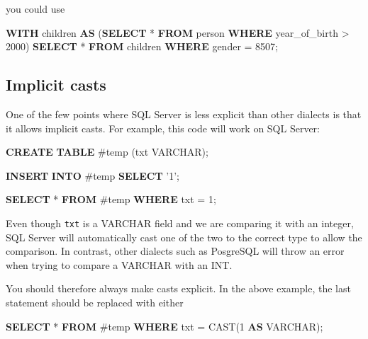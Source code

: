\documentclass[]{article}
\newenvironment{Shaded}{\begin{snugshade}}{\end{snugshade}}
\newcommand{\DataTypeTok}[1]{\textcolor[rgb]{0.13,0.29,0.53}{#1}}
\newcommand{\DecValTok}[1]{\textcolor[rgb]{0.00,0.00,0.81}{#1}}
\newcommand{\FunctionTok}[1]{\textcolor[rgb]{0.00,0.00,0.00}{#1}}
\newcommand{\KeywordTok}[1]{\textcolor[rgb]{0.13,0.29,0.53}{\textbf{#1}}}
\newcommand{\NormalTok}[1]{#1}
\newcommand{\StringTok}[1]{\textcolor[rgb]{0.31,0.60,0.02}{#1}}
\begin{document}
you could use

\begin{Shaded}
\begin{Highlighting}[]
\KeywordTok{WITH}\NormalTok{ children }\KeywordTok{AS}\NormalTok{ (}\KeywordTok{SELECT}\NormalTok{ * }\KeywordTok{FROM}\NormalTok{ person }\KeywordTok{WHERE}\NormalTok{ year_of_birth > }\DecValTok{2000}\NormalTok{)}
\KeywordTok{SELECT}\NormalTok{ * }\KeywordTok{FROM}\NormalTok{ children }\KeywordTok{WHERE}\NormalTok{ gender = }\DecValTok{8507}\NormalTok{;}
\end{Highlighting}
\end{Shaded}

\hypertarget{implicit-casts}{%
\subsection{Implicit casts}\label{implicit-casts}}

One of the few points where SQL Server is less explicit than other
dialects is that it allows implicit casts. For example, this code will
work on SQL Server:

\begin{Shaded}
\begin{Highlighting}[]
\KeywordTok{CREATE} \KeywordTok{TABLE}\NormalTok{ #temp (txt }\DataTypeTok{VARCHAR}\NormalTok{);}

\KeywordTok{INSERT} \KeywordTok{INTO}\NormalTok{ #temp}
\KeywordTok{SELECT} \StringTok{'1'}\NormalTok{;}

\KeywordTok{SELECT}\NormalTok{ * }\KeywordTok{FROM}\NormalTok{ #temp }\KeywordTok{WHERE}\NormalTok{ txt = }\DecValTok{1}\NormalTok{;}
\end{Highlighting}
\end{Shaded}

Even though \texttt{txt} is a VARCHAR field and we are comparing it with
an integer, SQL Server will automatically cast one of the two to the
correct type to allow the comparison. In contrast, other dialects such
as PosgreSQL will throw an error when trying to compare a VARCHAR with
an INT.

You should therefore always make casts explicit. In the above example,
the last statement should be replaced with either

\begin{Shaded}
\begin{Highlighting}[]
\KeywordTok{SELECT}\NormalTok{ * }\KeywordTok{FROM}\NormalTok{ #temp }\KeywordTok{WHERE}\NormalTok{ txt = }\FunctionTok{CAST}\NormalTok{(}\DecValTok{1} \KeywordTok{AS} \DataTypeTok{VARCHAR}\NormalTok{);}
\end{Highlighting}
\end{Shaded}
\end{document}
